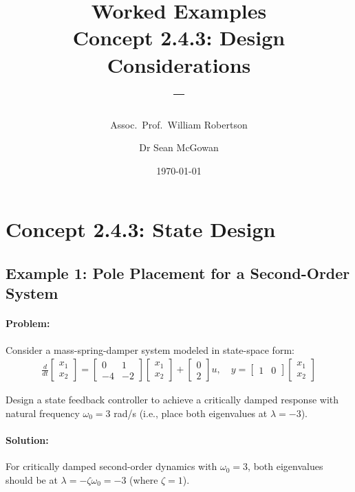 \documentclass[11pt,a4paper]{article}
\title{\textbf{Worked Examples}\\[0.5em]
\large Concept 2.4.3: Design Considerations\\[0.3em]
\normalsize \coursesubtitle{} -- \coursetitle}
\author{Assoc.\ Prof.\ William Robertson \and Dr Sean McGowan}
\date{\today}
\begin{document}
\maketitle
\tableofcontents
\newpage

\section{Concept 2.4.3: State Design}

\subsection{Example 1: Pole Placement for a Second-Order System}

\paragraph{Problem:} Consider a mass-spring-damper system modeled in state-space form:
\begin{align}
  \frac{d}{dt}\begin{bmatrix} x_1 \\ x_2 \end{bmatrix} = \begin{bmatrix} 0 & 1 \\ -4 & -2 \end{bmatrix}\begin{bmatrix} x_1 \\ x_2 \end{bmatrix} + \begin{bmatrix} 0 \\ 2 \end{bmatrix}u, \quad y = \begin{bmatrix} 1 & 0 \end{bmatrix}\begin{bmatrix} x_1 \\ x_2 \end{bmatrix}
\end{align}

Design a state feedback controller to achieve a critically damped response with natural frequency $\omega_0 = 3$ rad/s (i.e., place both eigenvalues at $\lambda = -3$).

\paragraph{Solution:}

For critically damped second-order dynamics with $\omega_0 = 3$, both eigenvalues should be at $\lambda = -\zeta\omega_0 = -3$ (where $\zeta = 1$).
\end{document}
